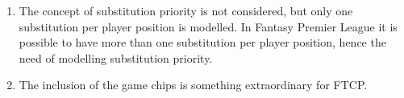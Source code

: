 \begin{enumerate}
    \item The concept of substitution priority is not considered, but only one substitution per player position is modelled. In Fantasy Premier League it is possible to have more than one substitution per player position, hence the need of modelling substitution priority. 
    \item The inclusion of the game chips is something extraordinary for FTCP. 
\end{enumerate}


\begin{comment}
\textbf{INSPO}

INTRODUCTION 
A fantasy sport game allows ordinary people to act like a team manager building a team of real individual
professional sport athletes. The real-world performances of these athletes (or their teams) are translated into
points for their team managers. The managers’ aim is to collect as many points as possible thereby defeating
the fantasy teams of opponents. In the remainder of this paper we will use the word 'participant' to describe a
virtual team manager while the word 'player' solely refers to a real-world athlete.
Fantasy sports found their origin in the United States in the 1980s. American journalists Glen Waggoner
& Daniel Okrent developed a game in which a handful of participants would draft from a pool of active
baseball players (Davis & Duncan, 2006). From the 1990s on, the Internet made game results more
accessible, and virtual leagues easier to manage. But fantasy sports really took off around the turn of the
millennium, when the internet transformed fantasy sports into a mainstream phenomenon. Fantasy sports are
now being played by tens of millions of people worldwide. Fantasy American football has become the most
popular fantasy sport league, with a market share of 80%
(http://www.fantasysportsadnetwork.com). In Europe, soccer is the most popular fantasy sport subject. The
enormous success of fantasy sports has a lot to do with the fact that it allows online participants to assume an
active role of a team owner or a team manager in a sport they are heavily interested in, thereby intensifying
the way live sport is consumed. As a result, many sports enthusiasts are now obtaining their sports
entertainment through fantasy sports rather than solely by watching games on television (Nesbit & King,
2011).


\end{comment}
